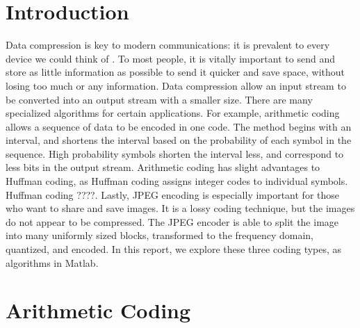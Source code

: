 \documentclass[11pt,a4paper,table]{article}
\begin{document}
\section{Introduction}
Data compression is key to modern communications: it is prevalent to every device we could think of \cite{Salomon2007}. To most people, it is vitally important to send and store as little information as possible to send it quicker and save space, without losing too much or any information. Data compression allow an input stream to be converted into an output stream with a smaller size. There are many specialized algorithms for certain applications. For example, arithmetic coding allows a sequence of data to be encoded in one code. The method begins with an interval, and shortens the interval based on the probability of each symbol in the sequence. High probability symbols shorten the interval less, and correspond to less bits in the output stream. Arithmetic coding has slight advantages to Huffman coding, as Huffman coding assigns integer codes to individual symbols. Huffman coding ????. Lastly, JPEG encoding is especially important for those who want to share and save images. It is a lossy coding technique, but the images do not appear to be compressed. The JPEG encoder is able to split the image into many uniformly sized blocks, transformed to the frequency domain, quantized, and encoded. In this report, we explore these three coding types, as algorithms in Matlab.

\section{Arithmetic Coding}
\end{document}
